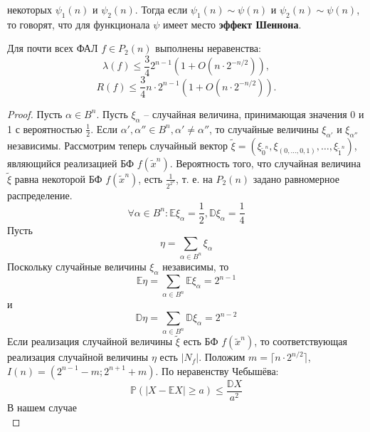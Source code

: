 \documentclass[11pt]{article}
\newcounter{th}\setcounter{th}{0}
\newcounter{stnmt}\setcounter{stnmt}{0}
\def\st{\par\smallskip\refstepcounter{stnmt}\textbf{\arabic{stnmt}}}
\newtheorem*{Statement}{Утверждение \st}
\begin{document}
некоторых $\psi_1(n)$ и $\psi_2(n)$. Тогда если $\psi_1(n) \sim \psi(n)$ и
$\psi_2(n) \sim \psi(n)$, то говорят, что для функционала $\psi$ имеет место \textbf{эффект Шеннона}.
\begin{Statement}
Для почти всех ФАЛ $f \in P_2(n)$ выполнены неравенства:
\begin{equation*}
\lambda(f) \leq \frac342^{n - 1}(1 + O(n\cdot2^{-n/2})),
\end{equation*}
\begin{equation*}
R(f) \leq \frac34n\cdot2^{n - 1}(1 + O(n\cdot2^{-n/2})).
\end{equation*}
\end{Statement}
\begin{proof}
Пусть $\alpha \in B^n$. Пусть $\xi_{\alpha}$ -- случайная величина, принимающая значения 0 и 1 с
вероятностью $\frac12$. Если $\alpha', \alpha'' \in B^n, \alpha' \neq \alpha''$, то случайные
величины $\xi_{\alpha'}$ и $\xi_{\alpha''}$ независимы. Рассмотрим теперь случайный вектор
$\tilde{\xi} = (\xi_{\tilde{0}^n}, \xi_{(0, \ldots, 0, 1)}, \ldots, \xi_{\tilde{1}^n})$,
являющийся реализацией БФ $f(\tilde{x}^n)$. Вероятность того, что случайная величина $\tilde{\xi}$
равна некоторой БФ $f(\tilde{x}^n)$, есть $\frac1{2^{2^n}}$, т. е. на $P_2(n)$ задано равномерное
распределение.
\begin{equation*}
\forall \alpha \in B^n: \mathbb{E}\xi_{\alpha} = \frac12, \mathbb{D}\xi_{\alpha} = \frac14
\end{equation*}
Пусть
\begin{equation*}
\eta = \sum_{\alpha \in B^n}\xi_{\alpha}
\end{equation*}
Поскольку случайные величины $\xi_{\alpha}$ независимы, то
\begin{equation*}
\mathbb{E}\eta = \sum_{\alpha \in B^n}\mathbb{E}\xi_{\alpha} = 2^{n - 1}
\end{equation*}
и
\begin{equation*}
\mathbb{D}\eta = \sum_{\alpha \in B^n}\mathbb{D}\xi_{\alpha} = 2^{n - 2}
\end{equation*}
Если реализация случайной величины $\tilde{\xi}$ есть БФ $f(\tilde{x}^n)$, то соответствующая
реализация случайной величины $\eta$ есть $|N_f|$. Положим $m = \lceil n\cdot2^{n/2}\rceil$,
$I(n) = (2^{n - 1} - m; 2^{n + 1} + m)$.
По неравенству Чебышёва:
\begin{equation*}
\mathbb{P}(|X - \mathbb{E}X| \geq a) \leq \frac{\mathbb{D}X}{a^2}
\end{equation*}
В нашем случае
\begin{equation*}

\end{equation*}
\end{proof}
\end{document}

